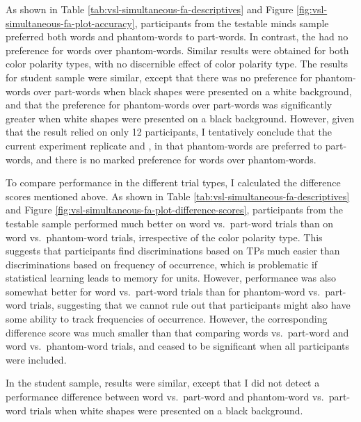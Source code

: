 \documentclass[
]{article}
\begin{document}
As shown in Table \ref{tab:vsl-simultaneous-fa-descriptives} and Figure
\ref{fig:vsl-simultaneous-fa-plot-accuracy}, participants from the
testable minds sample preferred both words and phantom-words to
part-words. In contrast, the had no preference for words over
phantom-words. Similar results were obtained for both color polarity
types, with no discernible effect of color polarity type. The results
for student sample were similar, except that there was no preference for
phantom-words over part-words when black shapes were presented on a
white background, and that the preference for phantom-words over
part-words was significantly greater when white shapes were presented on
a black background. However, given that the result relied on only 12
participants, I tentatively conclude that the current experiment
replicate \citep{Endress-Phantoms} and \citep{Endress-Phantoms-Vision},
in that phantom-words are preferred to part-words, and there is no
marked preference for words over phantom-words.

To compare performance in the different trial types, I calculated the
difference scores mentioned above. As shown in Table
\ref{tab:vsl-simultaneous-fa-descriptives} and Figure
\ref{fig:vsl-simultaneous-fa-plot-difference-scores}, participants from
the testable sample performed much better on word vs.~part-word trials
than on word vs.~phantom-word trials, irrespective of the color polarity
type. This suggests that participants find discriminations based on TPs
much easier than discriminations based on frequency of occurrence, which
is problematic if statistical learning leads to memory for units.
However, performance was also somewhat better for word vs.~part-word
trials than for phantom-word vs.~part-word trials, suggesting that we
cannot rule out that participants might also have some ability to track
frequencies of occurrence. However, the corresponding difference score
was much smaller than that comparing words vs.~part-word and word
vs.~phantom-word trials, and ceased to be significant when all
participants were included.

In the student sample, results were similar, except that I did not
detect a performance difference between word vs.~part-word and
phantom-word vs.~part-word trials when white shapes were presented on a
black background.
\end{document}

